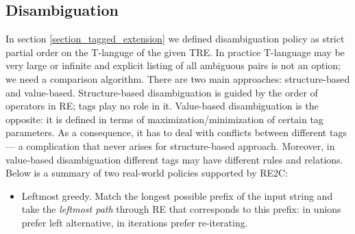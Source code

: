 \documentclass{article}
\theoremstyle{definition}
\begin{document}
\begin{multicols}{2}



\section{Disambiguation}\label{section_disambiguation}

In section \ref{section_tagged_extension} we defined disambiguation policy as strict partial order on the T-languge of the given TRE.
In practice T-language may be very large or infinite
and explicit listing of all ambiguous pairs is not an option; we need a comparison algorithm.
There are two main approaches: structure-based and value-based.
Structure-based disambiguation is guided by the order of operators in RE; tags play no role in it.
Value-based disambiguation is the opposite: it is defined in terms of maximization/minimization of certain tag parameters.
As a consequence, it has to deal with conflicts between different tags ---
a complication that never arises for structure-based approach.
Moreover, in value-based disambiguation different tags may have different rules and relations.
Below is a summary of two real-world policies supported by RE2C:
\\

\begin{itemize}
    \setlength{\parskip}{0.5em}
    \item Leftmost greedy.
        Match the longest possible prefix of the input string
        and take the \emph{leftmost path} through RE that corresponds to this prefix:
        in unions prefer left alternative, in iterations prefer re-iterating.


\end{itemize}
\end{multicols}
\end{document}
